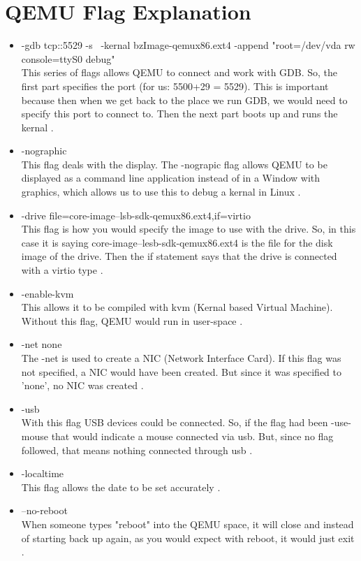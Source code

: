 \documentclass[10pt, onecolumn, letterpaper, draftclsnofoot]{IEEEtran}
\begin{document}
\section{QEMU Flag Explanation}
\begin{itemize}
\item{-gdb tcp::5529 -s \ -kernal bzImage-qemux86.ext4 \--append "root=/dev/vda rw console=ttyS0 debug"} \\
This series of flags allows QEMU to connect and work with GDB. So, the first part 
specifies the port (for us: 5500+29 = 5529). This is important because then when we
get back to the place we run GDB, we would need to specify this port to connect to. 
Then the next part boots up and runs the kernal \cite{DOC:1}.
\item{-nographic} \\
This flag deals with the display. The -nograpic flag allows QEMU to be displayed as
a command line application instead of in a Window with graphics, which allows us to 
use this to debug a kernal in Linux \cite{DOC:1}. 
\item{-drive file=core-image--lsb-sdk-qemux86.ext4,if=virtio} \\
This flag is how you would specify the image to use with the drive. So, in this case
it is saying core-image--lesb-sdk-qemux86.ext4 is the file for the disk image of the 
drive. Then the if statement says that the drive is connected with a virtio type \cite{MAN:2}.
\item{-enable-kvm} \\
This allows it to be compiled with kvm (Kernal based Virtual Machine). Without this
flag, QEMU would run in user-space \cite{MAN:2}. 
\item{-net none} \\
The -net is used to create a NIC (Network Interface Card). If this flag was not 
specified, a NIC would have been created. But since it was specified to 'none', no NIC
was created \cite{MAN:2}.
\item{-usb} \\
With this flag USB devices could be connected. So, if the flag had been -use-mouse
that would indicate a mouse connected via usb. But, since no flag followed, that means
nothing connected through usb \cite{DOC:1}. 
\item{-localtime} \\
This flag allows the date to be set accurately \cite{DOC:1}.
\item{--no-reboot} \\ 
When someone types "reboot" into the QEMU space, it will close and instead of starting
back up again, as you would expect with reboot, it would just exit \cite{DOC:1}.
\end{itemize}
\end{document}
